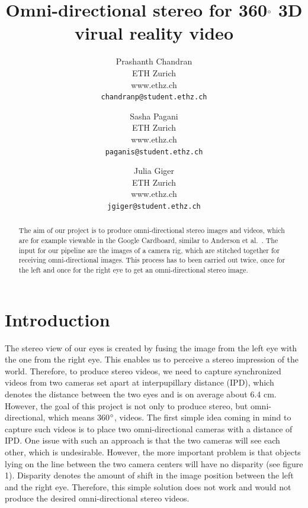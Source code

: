 \documentclass[10pt,twocolumn,letterpaper]{article}
\begin{document}
\title{Omni-directional stereo for 360$\degree$ 3D virual reality video}

\author{Prashanth Chandran\\
ETH Zurich\\
www.ethz.ch\\
{\tt\small chandranp@student.ethz.ch}
\and
Sasha Pagani\\
ETH Zurich\\
www.ethz.ch\\
{\tt\small paganis@student.ethz.ch}
\and
Julia Giger\\
ETH Zurich\\
www.ethz.ch\\
{\tt\small jgiger@student.ethz.ch}
}

\maketitle

\begin{abstract}
   The aim of our project is to produce omni-directional stereo images and videos, which are for example viewable in the Google Cardboard, similar to Anderson et al.~\cite{jump16}. The input for our pipeline are the images of a camera rig, which are stitched together for receiving omni-directional images. This process has to been carried out twice, once for the left and once for the right eye to get an omni-directional stereo image.
\end{abstract}

\section{Introduction}

The stereo view of our eyes is created by fusing the image from the left eye with the one from the right eye. This enables us to perceive a stereo impression of the world. Therefore, to produce stereo videos, we need to capture synchronized videos from two cameras set apart at interpupillary distance (IPD), which denotes the distance between the two eyes and is on average about 6.4 cm. However, the goal of this project is not only to produce stereo, but omni-directional, which means 360$\degree$, videos. The first simple idea coming in mind to capture such videos is to place two omni-directional cameras with a distance of IPD. One issue with such an approach is that the two cameras will see each other, which is undesirable. However, the more important problem is that objects lying on the line between the two camera centers will have no disparity (see figure 1). Disparity denotes the amount of shift in the image position between the left and the right eye. Therefore, this simple solution does not work and would not produce the desired omni-directional stereo videos.
\end{document}
